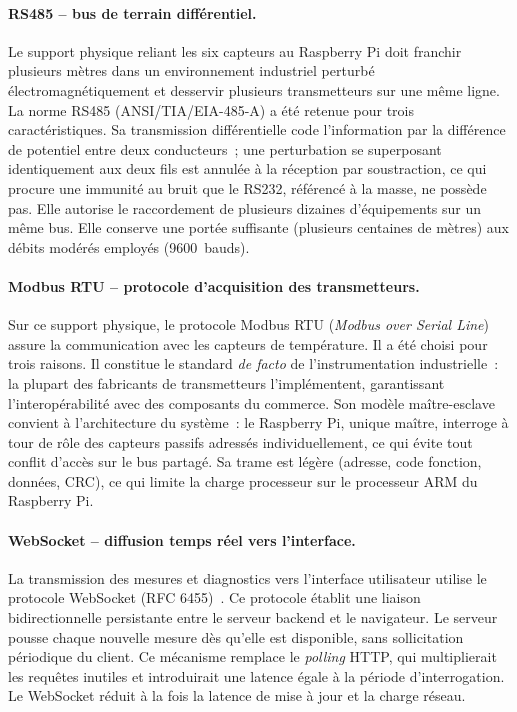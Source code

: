 \paragraph{RS485 -- bus de terrain différentiel.}
Le support physique reliant les six capteurs au Raspberry Pi doit franchir plusieurs mètres dans un environnement industriel perturbé électromagnétiquement et desservir plusieurs transmetteurs sur une même ligne. La norme RS485 (ANSI/TIA/EIA-485-A) a été retenue pour trois caractéristiques. Sa transmission différentielle code l'information par la différence de potentiel entre deux conducteurs~; une perturbation se superposant identiquement aux deux fils est annulée à la réception par soustraction, ce qui procure une immunité au bruit que le RS232, référencé à la masse, ne possède pas. Elle autorise le raccordement de plusieurs dizaines d'équipements sur un même bus. Elle conserve une portée suffisante (plusieurs centaines de mètres) aux débits modérés employés (9600~bauds).

\paragraph{Modbus RTU -- protocole d'acquisition des transmetteurs.}
Sur ce support physique, le protocole Modbus RTU (\emph{Modbus over Serial Line})~\cite{bib30} assure la communication avec les capteurs de température. Il a été choisi pour trois raisons. Il constitue le standard \emph{de facto} de l'instrumentation industrielle~: la plupart des fabricants de transmetteurs l'implémentent, garantissant l'interopérabilité avec des composants du commerce. Son modèle maître-esclave convient à l'architecture du système~: le Raspberry Pi, unique maître, interroge à tour de rôle des capteurs passifs adressés individuellement, ce qui évite tout conflit d'accès sur le bus partagé. Sa trame est légère (adresse, code fonction, données, CRC), ce qui limite la charge processeur sur le processeur ARM du Raspberry Pi.

\paragraph{WebSocket -- diffusion temps réel vers l'interface.}
La transmission des mesures et diagnostics vers l'interface utilisateur utilise le protocole WebSocket (RFC 6455)~\cite{bib35}. Ce protocole établit une liaison bidirectionnelle persistante entre le serveur backend et le navigateur. Le serveur pousse chaque nouvelle mesure dès qu'elle est disponible, sans sollicitation périodique du client. Ce mécanisme remplace le \emph{polling} HTTP, qui multiplierait les requêtes inutiles et introduirait une latence égale à la période d'interrogation. Le WebSocket réduit à la fois la latence de mise à jour et la charge réseau.

